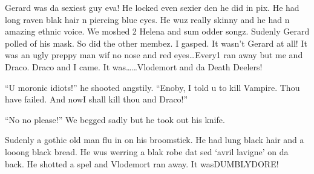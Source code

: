 Gerard was da sexiest guy eva! He locked even sexier den he did in pix. He had long raven blak hair n piercing blue eyes. He wuz really skinny and he had n amazing ethnic voice. We moshed 2 Helena and sum odder songz. Sudenly Gerard polled of his mask. So did the other membez. I gasped. It wasn't Gerard at all! It was an ugly preppy man wif no nose and red eyes\ldots Every1 ran away but me and Draco. Draco and I came. It was\ldots\ldots Vlodemort and da Death Deelers!

\enquote{U moronic idiots!} he shooted angstily. \enquote{Enoby, I told u to kill Vampire. Thou have failed. And now\dotfill I shall kill thou and Draco!}

\enquote{No no please!} We begged sadly but he took out his knife.

Sudenly a gothic old man flu in on his broomstick. He had lung black hair and a looong black bread. He wus werring a blak robe dat sed \enquote*{avril lavigne} on da back. He shotted a spel and Vlodemort ran away. It was\dotfill DUMBLYDORE\@!
